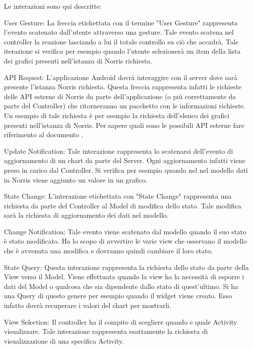     	Le interazioni sono qui descritte:
    	\begin{description}
	    	\item{User Gesture:}
	    		La freccia etichettata con il termine "User Gesture" rappresenta l'evento scatenato dall'utente attraverso una gesture. Tale evento scatena nel controller la reazione lasciando a lui il totale controllo su ciò che accadrà. Tale iterazione si verifica per esempio quando l'utente selezionerà un item della lista dei grafici presenti nell'istanza di Norris richiesta.
	    	\item{API Request:}
	    		L'applicazione Android dovrà interaggire con il server dove sarà presente l'istanza Norris richiesta. Questa freccia rappresenta infatti le richieste delle API esterne di Norris da parte dell'applicazione (o più correttamente da parte del Controller) che ritorneranno un pacchetto con le informazioni richieste. Un esempio di tale richiesta è per esempio la richiesta dell'elenco dei grafici presenti nell'istanza di Norris. Per sapere quali sono le possibili API esterne fare riferimento al documento .
	    	\item{Update Notification:}
	    		Tale interazione rappresenta lo scatenarsi dell'evento di aggiornamento di un chart da parte del Server. Ogni aggiornamento infatti viene preso in carico dal Controller. Si verifica per esempio quando nel nel modello dati in Norris viene aggiunto un valore in un grafico.
	    	\item{State Change:}
	    		L'interazione etichettata con "State Change" rappresenta una richiesta da parte del Controller al Model di modifica dello stato. Tale modifica sarà la richiesta di aggiornamento dei dati nel modello.
	    	\item{Change Notification:}
	    		Tale evento viene scatenato dal modello quando il suo stato è stato modificato. Ha lo scopo di avvertire le varie view che osservano il modello che è avvenuta una modifica e dovranno quindi cambiare il loro stato.
	    	\item{State Query:}
	    		Questa interazione rappresenta la richiesta dello stato da parte della View verso il Model. Viene effettuata quando la view ha la necessità di esporre i dati del Model o qualcosa che sia dipendente dallo stato di quest'ultimo. Si ha una Query di questo genere per esempio quando il widget viene creato. Esso infatto dovrà recuperare i valori del chart per mostrarli.
	    	\item{View Selection:}
	    		Il controller ha il compito di scegliere quando e quale Activity visualizzare. Tale interazione rappresenta esattamente la richiesta di visualizzazione di una specifica Activity.
	    \end{description}




